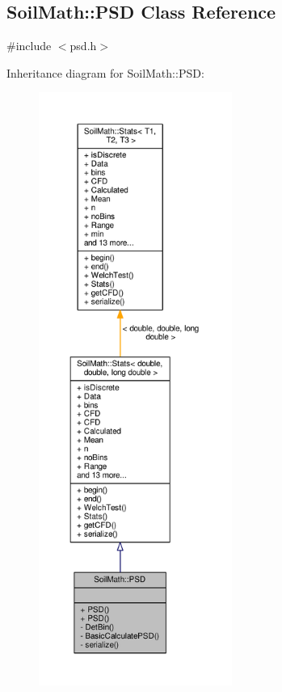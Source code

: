\hypertarget{class_soil_math_1_1_p_s_d}{}\subsection{Soil\+Math\+:\+:P\+S\+D Class Reference}
\label{class_soil_math_1_1_p_s_d}


{\ttfamily \#include $<$psd.\+h$>$}



Inheritance diagram for Soil\+Math\+:\+:P\+S\+D\+:
\nopagebreak
\begin{figure}[H]
\begin{center}
\leavevmode
\includegraphics[height=550pt]{class_soil_math_1_1_p_s_d__inherit__graph}
\end{center}
\end{figure}


